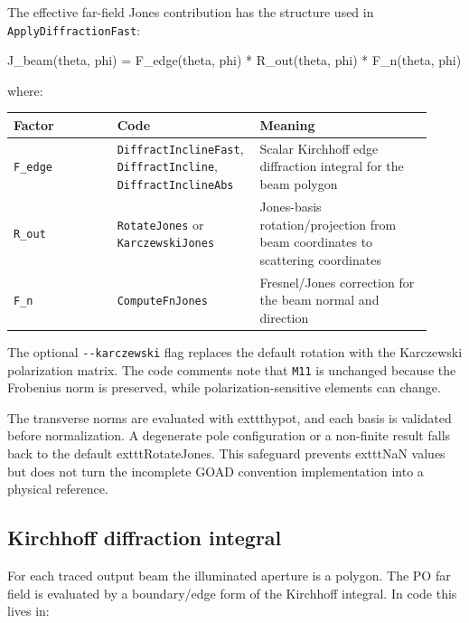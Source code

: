 \documentclass[
  10pt,
  a4paper,
]{article}
\newenvironment{Shaded}{}{}
\newcommand{\NormalTok}[1]{#1}
\begin{document}
The effective far-field Jones contribution has the structure used in
\texttt{ApplyDiffractionFast}:

\begin{Shaded}
\begin{Highlighting}[]
\NormalTok{J\_beam(theta, phi) = F\_edge(theta, phi) * R\_out(theta, phi) * F\_n(theta, phi)}
\end{Highlighting}
\end{Shaded}

where:

\begin{longtable}[]{@{}L{0.24\linewidth}L{0.28\linewidth}L{0.40\linewidth}@{}}
\toprule\noalign{}
Factor & Code & Meaning \\
\midrule\noalign{}
\endhead
\bottomrule\noalign{}
\endlastfoot
\texttt{F\_edge} & \texttt{DiffractInclineFast},
\texttt{DiffractIncline}, \texttt{DiffractInclineAbs} & Scalar Kirchhoff
edge diffraction integral for the beam polygon \\
\texttt{R\_out} & \texttt{RotateJones} or \texttt{KarczewskiJones} &
Jones-basis rotation/projection from beam coordinates to scattering
coordinates \\
\texttt{F\_n} & \texttt{ComputeFnJones} & Fresnel/Jones correction for
the beam normal and direction \\
\end{longtable}

The optional \texttt{-\/-karczewski} flag replaces the default rotation
with the Karczewski polarization matrix. The code comments note that
\texttt{M11} is unchanged because the Frobenius norm is preserved, while
polarization-sensitive elements can change.

The transverse norms are evaluated with 	exttt{hypot}, and each basis is
validated before normalization. A degenerate pole configuration or a
non-finite result falls back to the default 	exttt{RotateJones}. This
safeguard prevents 	exttt{NaN} values but does not turn the incomplete GOAD
convention implementation into a physical reference.

\subsection{Kirchhoff diffraction
integral}\label{kirchhoff-diffraction-integral}

For each traced output beam the illuminated aperture is a polygon. The
PO far field is evaluated by a boundary/edge form of the Kirchhoff
integral. In code this lives in:
\end{document}
